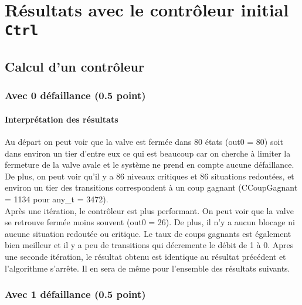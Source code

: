 \documentclass[a4paper]{book}
\begin{document}
\section{Résultats avec le contrôleur initial {\tt Ctrl}}
\subsection{Calcul d'un contrôleur}
\subsubsection{Avec 0 défaillance (0.5 point)}



%
%
\paragraph{Interprétation des résultats}
Au départ on peut voir que la valve est fermée dans 80 états (out0 = 80) 
soit dans environ un tier d'entre eux ce qui est beaucoup car on cherche à limiter la fermeture de la valve avale et le système ne prend en compte aucune défaillance. 
De plus, on peut voir qu'il y a 86 niveaux critiques et 86 situations redoutées, et environ un tier des transitions correspondent à un coup gagnant (CCoupGagnant = 1134 pour any\_t = 3472).\\
Après une itération, le contrôleur est plus performant. On peut voir que la valve se retrouve fermée moins souvent (out0 = 26). De plus, il n'y a aucun blocage 
ni aucune situation redoutée ou critique. Le taux de coups gagnants est également bien meilleur et il y a peu de transitions qui décremente le débit de 1 à 0.
Apres une seconde itération, le résultat obtenu est identique au résultat précédent et l'algorithme s'arrête. Il en sera de même pour l'ensemble des résultats suivants.


\subsubsection{Avec 1 défaillance (0.5 point)}




%
\end{document}
